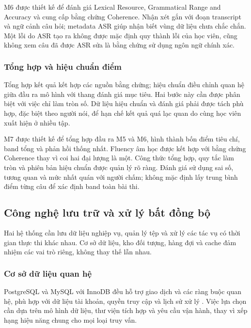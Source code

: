M6 được thiết kế để đánh giá Lexical Resource, Grammatical Range and Accuracy và cung cấp bằng chứng Coherence. Nhận xét gắn với đoạn transcript và ngữ cảnh câu hỏi; metadata ASR giúp nhận biết vùng dữ liệu chưa chắc chắn. Một lỗi do ASR tạo ra không được mặc định quy thành lỗi của học viên, cũng không xem câu đã được ASR sửa là bằng chứng sử dụng ngôn ngữ chính xác.

\subsubsection{Tổng hợp và hiệu chuẩn điểm}

Tổng hợp kết quả kết hợp các nguồn bằng chứng; hiệu chuẩn điều chỉnh quan hệ giữa đầu ra mô hình với thang đánh giá mục tiêu. Hai bước này cần được phân biệt với việc chỉ làm tròn số. Dữ liệu hiệu chuẩn và đánh giá phải được tách phù hợp, đặc biệt theo người nói, để hạn chế kết quả quá lạc quan do cùng học viên xuất hiện ở nhiều tập.

M7 được thiết kế để tổng hợp đầu ra M5 và M6, hình thành bốn điểm tiêu chí, band tổng và phản hồi thống nhất. Fluency âm học được kết hợp với bằng chứng Coherence thay vì coi hai đại lượng là một. Công thức tổng hợp, quy tắc làm tròn và phiên bản hiệu chuẩn được quản lý rõ ràng. Đánh giá sử dụng sai số, tương quan và mức nhất quán với người chấm; không mặc định lấy trung bình điểm từng câu để xác định band toàn bài thi.

\subsection{Công nghệ lưu trữ và xử lý bất đồng bộ}

Hai hệ thống cần lưu dữ liệu nghiệp vụ, quản lý tệp và xử lý các tác vụ có thời gian thực thi khác nhau. Cơ sở dữ liệu, kho đối tượng, hàng đợi và cache đảm nhiệm các vai trò riêng, không thay thế lẫn nhau.

\subsubsection{Cơ sở dữ liệu quan hệ}

PostgreSQL và MySQL với InnoDB đều hỗ trợ giao dịch và các ràng buộc quan hệ, phù hợp với dữ liệu tài khoản, quyền truy cập và lịch sử xử lý \parencite{ch4_postgresql_transactions,ch3_mysql_innodb}. Việc lựa chọn cần dựa trên mô hình dữ liệu, thư viện tích hợp và yêu cầu vận hành, thay vì xếp hạng hiệu năng chung cho mọi loại truy vấn.

